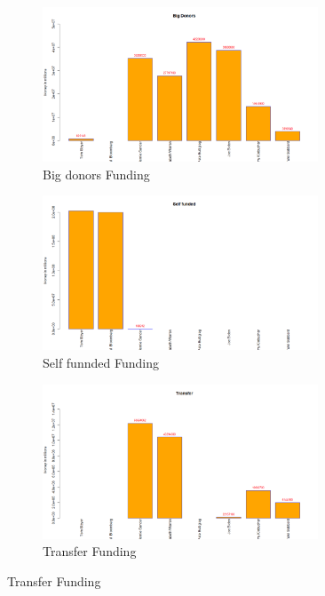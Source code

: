 \begin{figure}[H]
\begin{figure}[H]
    \centering
    \includegraphics[width=0.9\textwidth]{figures/Bigdonor.png}
    \caption{Big donors Funding}
    \label{Bigdonor}
\end{figure}

\begin{figure}[H]
    \centering
    \includegraphics[width=0.9\textwidth]{figures/Selffunnded.png}
    \caption{Self funnded Funding}
    \label{Selffunnded}
\end{figure}

\begin{figure}[H]
    \centering
    \includegraphics[width=0.9\textwidth]{figures/Transfer.png}
    \caption{Transfer Funding}
    \label{Transfer}
\end{figure}


\end{figure}
